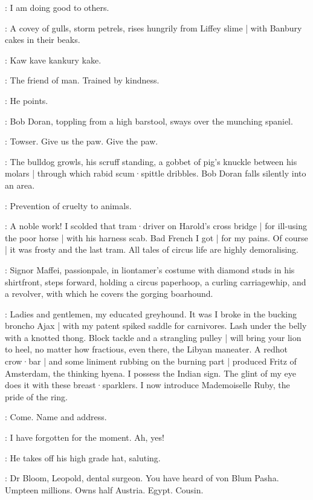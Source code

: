 \Bloom:
I am doing good to others.

:
A covey of gulls,
storm petrels,
rises hungrily from Liffey slime |
with Banbury cakes in their beaks.

\Gulls:
Kaw kave kankury kake.

\Bloom:
The friend of man.
Trained by kindness.

:
He points.

:
Bob Doran,
toppling from a high barstool,
sways over the munching spaniel.%

\Doran:
Towser.
Give us the paw.
Give the paw.

:
The bulldog growls,
his scruff standing,
a gobbet of pig's knuckle between his molars |
through which rabid scum·spittle dribbles.
Bob Doran falls silently into an area.

\SecondWatch[2]:
Prevention of cruelty to animals.

\Bloom:
A noble work!
I scolded that tram·driver on Harold's cross bridge |
for ill-using the poor horse |
with his harness scab.
Bad French I got |
for my pains.
Of course |
it was frosty and the last tram.
All tales of circus life are highly demoralising.

:
Signor Maffei,
passionpale,
in liontamer's costume with diamond studs in his shirtfront,
steps forward,
holding a circus paperhoop,
a curling carriagewhip,
and a revolver,
with which he covers the gorging boarhound.

\Maffei:
Ladies and gentlemen,
my educated greyhound.
It was I broke in the bucking broncho Ajax |
with my patent spiked saddle for carnivores.
Lash under the belly with a knotted thong.
Block tackle and a strangling pulley |
will bring your lion to heel,
no matter how fractious,
even  there,
the Libyan maneater.
A redhot crow·bar |
and some liniment rubbing on the burning part |
produced Fritz of Amsterdam,
the thinking hyena.
I possess the Indian sign.
The glint of my eye does it with these breast·sparklers.
I now introduce Mademoiselle Ruby,
the pride of the ring.

\FirstWatch[1]:
Come.
Name and address.

\Bloom:
I have forgotten for the moment.
Ah,
yes!

:
He takes off his high grade hat,
saluting.

\Bloom:
Dr Bloom,
Leopold,
dental surgeon.
You have heard of von Blum Pasha.
Umpteen millions.
Owns half Austria.
Egypt.
Cousin.

